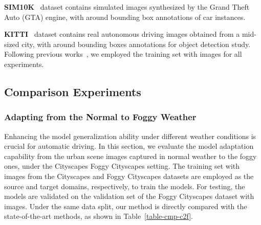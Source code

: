 \documentclass[journal]{IEEEtran}
\begin{document}
\textbf{SIM10K}~\cite{johnson2016driving} dataset contains  simulated images synthesized by the Grand Theft Auto (GTA) engine, with around  bounding box annotations of car instances. 

\textbf{KITTI}~\cite{geiger2012we} dataset contains  real autonomous driving images obtained from a mid-sized city, with around  bounding boxes annotations for object detection study. Following previous works~\cite{chen2018domain,he2019multi,he2020domain}, we employed the training set with  images for all experiments.



\subsection{Comparison Experiments}



\subsubsection{Adapting from the Normal to Foggy Weather}

Enhancing the model generalization ability under different weather conditions is crucial for automatic driving. In this section, we evaluate the model adaptation capability from the urban scene images captured in normal weather to the foggy ones, under the Cityscapes  Foggy Cityscapes setting. The training set with  images from the Cityscapes and Foggy Cityscapes datasets are employed as the source and target domains, respectively, to train the models. For testing, the models are validated on the validation set of the Foggy Cityscapes dataset with  images. Under the same data split, our method is directly compared with the state-of-the-art methods, as shown in Table~\ref{table-cmp-c2f}. {}
\end{document}
